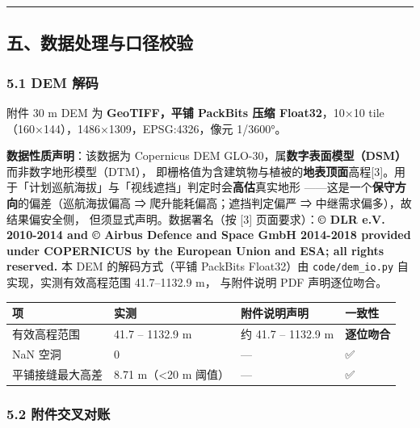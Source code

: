 \documentclass[
  10.5pt,
]{extarticle}
\newcounter{none} %
\begin{document}
\begin{center}\rule{0.5\linewidth}{0.5pt}\end{center}

\subsection{五、数据处理与口径校验}\label{ux4e94ux6570ux636eux5904ux7406ux4e0eux53e3ux5f84ux6821ux9a8c}

\subsubsection{5.1 DEM 解码}\label{dem-ux89e3ux7801}

附件 30 m DEM 为 \textbf{GeoTIFF，平铺 PackBits 压缩 Float32}，10×10
tile（160×144），1486×1309，EPSG:4326，像元 1/3600°。

\textbf{数据性质声明}：该数据为 Copernicus DEM
GLO-30，属\textbf{数字表面模型（DSM）}而非数字地形模型（DTM），
即栅格值为含建筑物与植被的\textbf{地表顶面}高程{[}3{]}。用于「计划巡航海拔」与「视线遮挡」判定时会\textbf{高估}真实地形
------这是一个\textbf{保守方向}的偏差（巡航海拔偏高 ⇒
爬升能耗偏高；遮挡判定偏严 ⇒ 中继需求偏多），故结果偏安全侧，
但须显式声明。数据署名（按 {[}3{]} 页面要求）：\textbf{© DLR e.V.
2010-2014 and © Airbus Defence and Space GmbH 2014-2018 provided under
COPERNICUS by the European Union and ESA; all rights reserved.} 本 DEM
的解码方式（平铺 PackBits Float32）由 \texttt{code/dem\_io.py}
自实现，实测有效高程范围 41.7--1132.9 m， 与附件说明 PDF 声明逐位吻合。

{\def\LTcaptype{none} %
\begin{longtable}[]{@{}llll@{}}
\toprule\noalign{}
项 & 实测 & 附件说明声明 & 一致性 \\
\midrule\noalign{}
\endhead
\bottomrule\noalign{}
\endlastfoot
有效高程范围 & 41.7 -- 1132.9 m & 约 41.7 -- 1132.9 m &
\textbf{逐位吻合} \\
NaN 空洞 & 0 & --- & ✅ \\
平铺接缝最大高差 & 8.71 m（\textless20 m 阈值） & --- & ✅ \\
\end{longtable}
}

\subsubsection{5.2
附件交叉对账}\label{ux9644ux4ef6ux4ea4ux53c9ux5bf9ux8d26}
\end{document}

